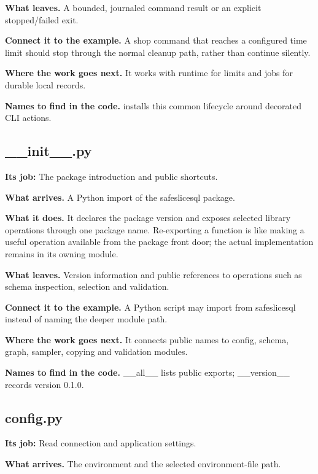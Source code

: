 \textbf{What leaves.} A bounded, journaled command result or an explicit stopped/failed exit.

\textbf{Connect it to the example.} A shop command that reaches a configured time limit should stop through the normal cleanup path, rather than continue silently.

\textbf{Where the work goes next.} It works with runtime for limits and jobs for durable local records.

\textbf{Names to find in the code.}  installs this common lifecycle around decorated CLI actions.


\subsection{\_\_init\_\_.py}

\textbf{Its job:} The package introduction and public shortcuts.

\textbf{What arrives.} A Python import of the safeslicesql package.

\textbf{What it does.} It declares the package version and exposes selected library operations through one package name. Re-exporting a function is like making a useful operation available from the package front door; the actual implementation remains in its owning module.

\textbf{What leaves.} Version information and public references to operations such as schema inspection, selection and validation.

\textbf{Connect it to the example.} A Python script may import  from safeslicesql instead of naming the deeper module path.

\textbf{Where the work goes next.} It connects public names to config, schema, graph, sampler, copying and validation modules.

\textbf{Names to find in the code.} \_\_all\_\_ lists public exports; \_\_version\_\_ records version 0.1.0.


\subsection{config.py}

\textbf{Its job:} Read connection and application settings.

\textbf{What arrives.} The environment and the selected environment-file path.

